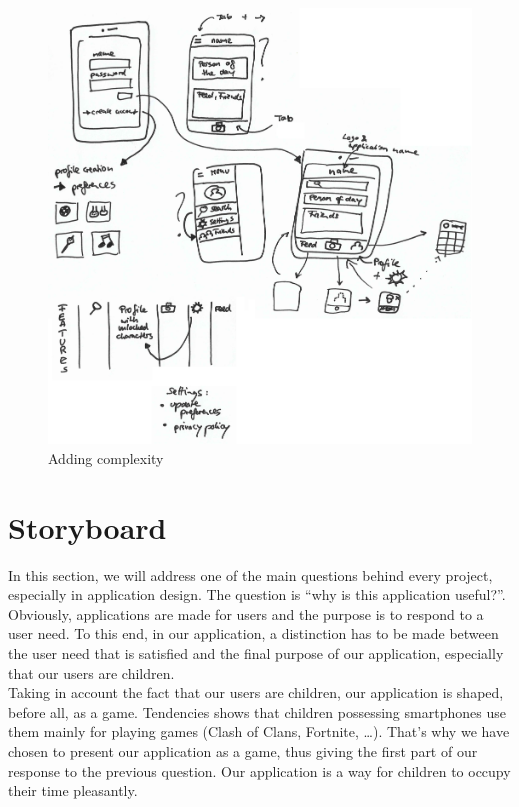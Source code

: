 \documentclass[12pt]{scrartcl}
\begin{document}
	\begin{figure}[H]
        		\centering
       		\includegraphics[width=\textwidth]{../images/design3.jpg}
       		\caption{Adding complexity}
        		\label{sketch3}
	\end{figure}
	
	
\section{Storyboard}
	

	In this section, we will address one of the main questions behind every project, especially in application design. The question is ``why is this application useful?”. Obviously, applications are made for users and the purpose is to respond to a user need. To this end, in our application, a distinction has to be made between the user need that is satisfied and the final purpose of our application, especially that our users are children.\\

	Taking in account the fact that our users are children, our application is shaped, before all, as a game. Tendencies shows that children possessing smartphones use them mainly for playing games (Clash of Clans, Fortnite, …). That’s why we have chosen to present our application as a game, thus giving the first part of our response to the previous question. Our application is a way for children to occupy their time pleasantly.\\
\end{document}
